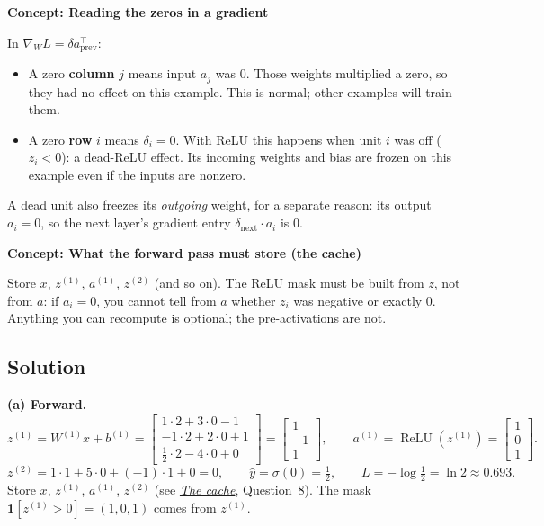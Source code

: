 \documentclass[12pt,a4paper]{article}
\newcommand{\concept}[2]{\par\medskip\phantomsection\label{#1}{\large\bfseries\color{blue!50!black} Concept: #2}\par}
\newcommand{\seeconcept}[3]{(see \hyperref[#1]{\textit{#2}}, Question~#3)}
\newcommand{\relu}{\operatorname{ReLU}}
\begin{document}
\concept{c:readzeros}{Reading the zeros in a gradient}
In $\nabla_{W}L=\delta a_{\text{prev}}^\top$:
\begin{itemize}[nosep]
\item A zero \textbf{column} $j$ means input $a_j$ was 0. Those weights multiplied a zero, so they had no effect on this example. This is normal; other examples will train them.
\item A zero \textbf{row} $i$ means $\delta_i=0$. With ReLU this happens when unit $i$ was off ($z_i<0$): a dead-ReLU effect. Its incoming weights and bias are frozen on this example even if the inputs are nonzero.
\end{itemize}
A dead unit also freezes its \emph{outgoing} weight, for a separate reason: its output $a_i=0$, so the next layer's gradient entry $\delta_{\text{next}}\cdot a_i$ is 0.

\concept{c:cache}{What the forward pass must store (the cache)}
Store $x$, $z^{(1)}$, $a^{(1)}$, $z^{(2)}$ (and so on). The ReLU mask must be built from $z$, not from $a$: if $a_i=0$, you cannot tell from $a$ whether $z_i$ was negative or exactly 0. Anything you can recompute is optional; the pre-activations are not.

\subsection*{Solution}
\textbf{(a) Forward.}
\[
z^{(1)}=W^{(1)}x+b^{(1)}=\begin{bmatrix}1\cdot2+3\cdot0-1\\-1\cdot2+2\cdot0+1\\ \tfrac12\cdot2-4\cdot0+0\end{bmatrix}=\begin{bmatrix}1\\-1\\1\end{bmatrix},\qquad
a^{(1)}=\relu(z^{(1)})=\begin{bmatrix}1\\0\\1\end{bmatrix}.
\]
\[
z^{(2)}=1\cdot1+5\cdot0+(-1)\cdot1+0=0,\qquad \hat y=\sigma(0)=\tfrac12,\qquad L=-\log\tfrac12=\ln2\approx0.693 .
\]
Store $x$, $z^{(1)}$, $a^{(1)}$, $z^{(2)}$ \seeconcept{c:cache}{The cache}{8}. The mask $\mathbf 1[z^{(1)}>0]=(1,0,1)$ comes from $z^{(1)}$.
\end{document}
